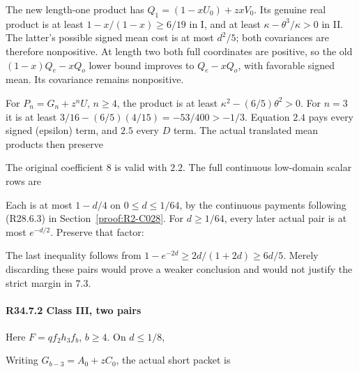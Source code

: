 The new length-one product has
\(Q_1=(1-xU_0)+zxV_0\). Its genuine real product is at least
\(1-x/(1-x)\ge6/19\) in I, and at least
\(\kappa-\theta^3/\kappa>0\) in II. The latter's possible signed
mean cost is at most \(d^2/5\); both covariances are therefore nonpositive.
At length two both full coordinates are positive, so the old
\((1-x)Q_e-xQ_o\) lower bound improves to \(Q_e-xQ_o\), with favorable
signed mean. Its covariance remains nonpositive.

For \(P_n=G_n+z^nU\), \(n\ge4\), the product is at least
\(\kappa^2-(6/5)\theta^2>0\). For \(n=3\) it is at least
\(3/16-(6/5)(4/15)=-53/400>-1/3\).
Equation \(2.4\) pays every signed (epsilon) term, and \(2.5\) every
\(D\) term. The actual translated mean products then preserve


The original coefficient 8 is valid with \(2.2\). The full continuous
low-domain scalar rows are


Each is at most \(1-d/4\) on \(0\le d\le1/64\), by the
continuous payments following (R28.6.3) in
Section~\ref{proof:R2-C028}. For \(d\ge1/64\), every later actual pair is at most
\(e^{-d/2}\). Preserve that factor:


The last inequality follows from \(1-e^{-2d}\ge2d/(1+2d)\ge6d/5\).
Merely discarding these pairs would prove a weaker conclusion and would
not justify the strict margin in \(7.3\).

\paragraph{R34.7.2 Class III, two pairs}

Here \(F=qf_2h_3f_b\), \(b\ge4\). On \(d\le1/8\),


Writing \(G_{b-3}=A_0+zC_0\), the actual short packet is


